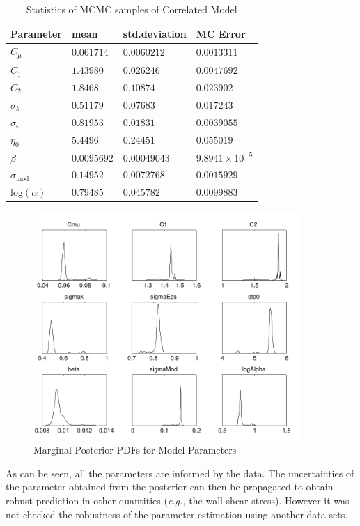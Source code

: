 \documentclass[11pt,titlepage]{article}
\begin{document}
\begin{table}[htbp]
	\centering
	    \caption{Statistics of MCMC samples of Correlated Model}
		\begin{tabular}{l l l l}
			\hline \hline
			Parameter										& mean 				& std.deviation			& MC Error 		\\
			\hline
			$C_\mu$											& $0.061714$	& $0.0060212$ 			& $0.0013311$ \\
			$C_1$												& $1.43980$	 	& $0.026246$ 				& $0.0047692 $ \\
			$C_2$												& $1.8468$ 		&	$0.10874$ 				& $0.023902$ \\
			$\sigma_k$									& $0.51179$ 	& $0.07683$ 				& $0.017243$ \\
			$\sigma_\epsilon$						& $0.81953$ 	& $0.01831$ 				& $0.0039055$ \\
			$\eta_0$										& $5.4496$ 		& $0.24451$ 				& $0.055019$ \\
			$\beta$							   			& $0.0095692$ & $0.00049043$ 			& $9.8941 \times 10^{-5}$ \\
			$\sigma_{\text{mod}}$				& $0.14952$ 	& $0.0072768$ 			& $0.0015929$ \\
			$\text{log}(\alpha)$				& $0.79485$ 	& $0.045782$ 				& $0.0099883$ \\       
			\hline
		\end{tabular}
	\label{tab:StatMCMCCorr}
\end{table}

\begin{figure}[htbp]
	\centering
	\includegraphics[width=0.9\textwidth]{ParamEstCorrDRAM.pdf}
	\caption{Marginal Posterior PDFs for Model Parameters}
	\label{fig:MarginalPosteriorPDFsForModelParameters}
\end{figure}
As can be seen, all the parameters are informed by the data. 
The uncertainties of the parameter obtained from the posterior can then be propagated to obtain robust prediction in other quantities (\textit{e.g.,} the wall shear stress). 
However it was not checked the robustness of the parameter estimation using another data sets. 
\end{document}
